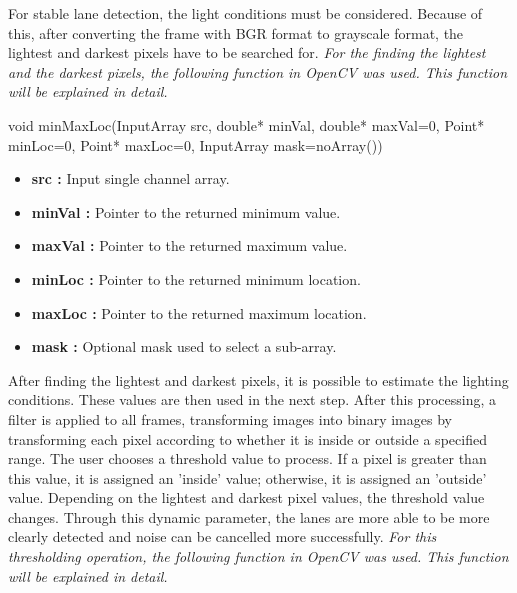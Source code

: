 For stable lane detection, the light conditions must be considered. Because of this, after converting the frame with BGR format to grayscale format, the lightest and darkest pixels have to be searched for. \emph{\color{blue}For the finding the lightest and the darkest pixels, the following function in OpenCV was used. This function will be explained in detail.}\cite{addWeighted}


\begin{center}

void minMaxLoc(InputArray src, double* minVal, double* maxVal=0, Point* minLoc=0, Point* maxLoc=0, InputArray mask=noArray())

\end{center}

\begin{itemize}

\item \textbf{src : }Input single channel array.

\item \textbf{minVal : }Pointer to the returned minimum value.

\item \textbf{maxVal : }Pointer to the returned maximum value.

\item \textbf{minLoc : }Pointer to the returned minimum location.

\item \textbf{maxLoc : }Pointer to the returned maximum location.

\item \textbf{mask : }Optional mask used to select a sub-array.

\end{itemize}


After finding the lightest and darkest pixels, it is possible to estimate the lighting conditions. These values are then used in the next step. After this processing, a filter is applied to all frames, transforming images into binary images by transforming each pixel according to whether it is inside or outside a specified range. The user chooses a threshold value to process. If a pixel is greater than this value, it is assigned an 'inside' value; otherwise, it is assigned an 'outside' value. Depending on the lightest and darkest pixel values, the threshold value changes. Through this dynamic parameter, the lanes are more able to be more clearly detected and noise can be cancelled more successfully. \emph{\color{blue}For this thresholding operation, the following function in OpenCV was used. This function will be explained in detail.}\citep{threshold}


